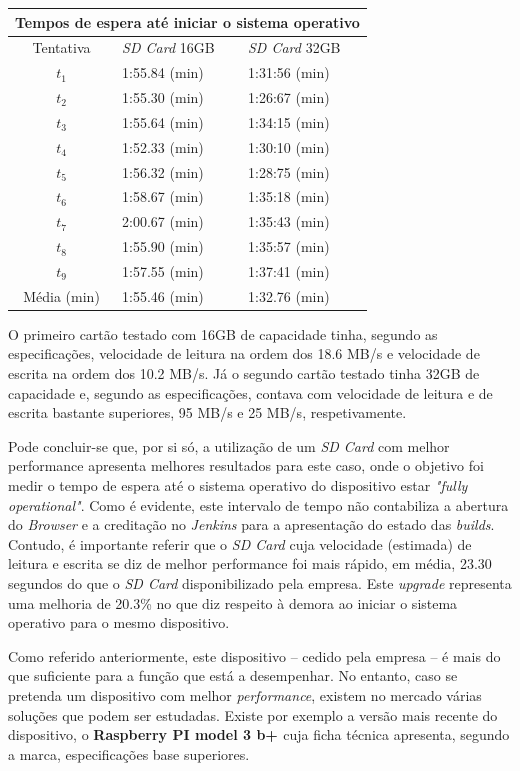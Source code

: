 \begin{center}
\begin{tabular}{ |c||p{3cm}|p{3cm}|  }
 \hline
 \multicolumn{3}{|c|}{Tempos de espera até iniciar o sistema operativo} \\
 \hline
 Tentativa & \textit{SD Card} 16GB & \textit{SD Card} 32GB\\
 \hline
 $t_{1}$ & 1:55.84 (min) & 1:31:56 (min)\\
 $t_{2}$ & 1:55.30 (min) & 1:26:67 (min)\\
 $t_{3}$ & 1:55.64 (min) & 1:34:15 (min)\\
 $t_{4}$ & 1:52.33 (min) & 1:30:10 (min)\\
 $t_{5}$ & 1:56.32 (min) & 1:28:75 (min)\\
 $t_{6}$ & 1:58.67 (min) & 1:35:18 (min)\\
 $t_{7}$ & 2:00.67 (min) & 1:35:43 (min)\\
 $t_{8}$ & 1:55.90 (min) & 1:35:57 (min)\\
 $t_{9}$ & 1:57.55 (min) & 1:37:41 (min)\\
  \hline
 Média (min) & 1:55.46 (min) & 1:32.76 (min)\\
 \hline
\end{tabular}
\end{center}

\hspace{1cm}O primeiro cartão testado com 16GB de capacidade tinha, segundo as especificações, velocidade de leitura na ordem dos 18.6 MB/s e velocidade de escrita na ordem dos 10.2 MB/s. Já o segundo cartão testado tinha 32GB de capacidade e, segundo as especificações, contava com velocidade de leitura e de escrita bastante superiores, 95 MB/s e 25 MB/s, respetivamente.  

\hspace{1cm}Pode concluir-se que, por si só, a utilização de um \textit{SD Card} com melhor performance apresenta melhores resultados para este caso, onde o objetivo foi medir o tempo de espera até o sistema operativo do dispositivo estar \textit{"fully operational"}. Como é evidente, este intervalo de tempo não contabiliza a abertura do \textit{Browser} e a creditação no \textit{Jenkins} para a apresentação do estado das \textit{builds}. Contudo, é importante referir que o \textit{SD Card} cuja velocidade (estimada) de leitura e escrita se diz de melhor performance foi mais rápido, em média, 23.30 segundos do que o \textit{SD Card} disponibilizado pela empresa. Este \textit{upgrade} representa uma melhoria de 20.3\% no que diz respeito à demora ao iniciar o sistema operativo para o mesmo dispositivo.

\hspace{1cm}Como referido anteriormente, este dispositivo -- cedido pela empresa -- é mais do que suficiente para a função que está a desempenhar. No entanto, caso se pretenda um dispositivo com melhor \textit{performance}, existem no mercado várias soluções que podem ser estudadas. Existe por exemplo a versão mais recente do dispositivo, o {\textbf{Raspberry PI model 3 b+ \cite{rasbperryPIModel3bplus}}} cuja ficha técnica apresenta, segundo a marca, especificações base superiores.


